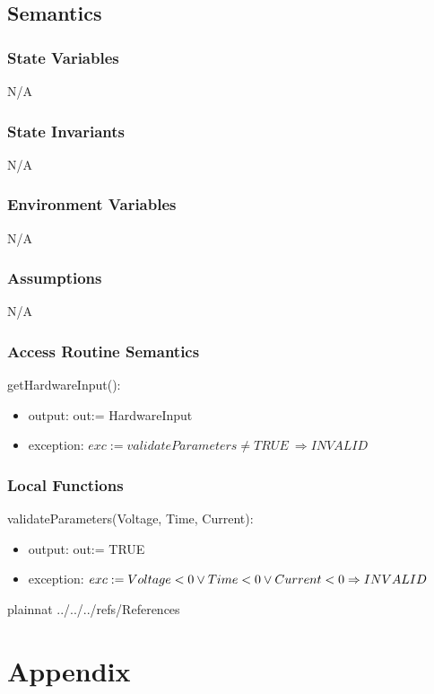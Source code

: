 \documentclass[12pt, titlepage]{article}
\begin{document}
\subsection{Semantics}

\subsubsection{State Variables}
N/A

\subsubsection{State Invariants}
N/A

\subsubsection{Environment Variables}

N/A

\subsubsection{Assumptions}
N/A

\subsubsection{Access Routine Semantics}

\noindent getHardwareInput():
\begin{itemize}
\item output: out:= HardwareInput
\item exception: $exc:= 
validateParameters \ne TRUE \
\Rightarrow INVALID$
\end{itemize}


\subsubsection{Local Functions}
\noindent validateParameters(Voltage, Time, Current):
\begin{itemize}
\item output: out:= TRUE
\item exception: $exc:= 
Voltage < 0 \lor \\
Time < 0 \lor Current < 0 \\
\Rightarrow INVALID$
\end{itemize}
\newpage

 {plainnat}
 {../../../refs/References}

\newpage

\section{Appendix} \label{Appendix}
\end{document}

